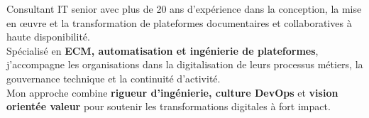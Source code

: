 \par{
Consultant IT senior avec plus de 20 ans d’expérience dans la conception, la mise en œuvre et la transformation de plateformes documentaires et collaboratives à haute disponibilité.\\
Spécialisé en \textbf{ECM, automatisation et ingénierie de plateformes}, j’accompagne les organisations dans la digitalisation de leurs processus métiers, la gouvernance technique et la continuité d’activité.\\
Mon approche combine \textbf{rigueur d’ingénierie, culture DevOps} et \textbf{vision orientée valeur} pour soutenir les transformations digitales à fort impact.
}